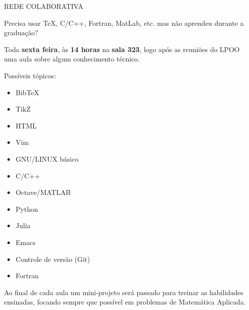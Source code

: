 \documentclass[12pt,a4paper]{letter}
\begin{document}
\pagestyle{empty}
\begin{Huge}
\begin{center}
	REDE COLABORATIVA
\end{center}
\end{Huge}

\begin{Large}

Precisa usar TeX, C/C++, Fortran, MatLab, etc. mas não aprendeu durante a graduação?


Toda {\bf sexta feira}, às {\bf 14 horas} na {\bf sala 323}, logo após as reuniões 
do LPOO uma aula sobre algum conhecimento t\'{e}cnico.

\begin{center}
\end{center}
 
Possíveis tópicos:

\begin{minipage}{.4\textwidth}
\begin{itemize}[leftmargin=*]
\item	BibTeX
\item	TikZ
\item	HTML
\item	Vim
\item	GNU/LINUX básico
\item	C/C++
\end{itemize}
\end{minipage}
\begin{minipage}{.4\textwidth}
\begin{itemize}[leftmargin=*]
\item	Octave/MATLAB
\item	Python
\item	Julia
\item	Emacs
\item	Controle de versão (Git)
\item 	Fortran
\end{itemize}
\end{minipage}
\vspace{1cm}

Ao final de cada aula um mini-projeto será passado para treinar as habilidades 
ensinadas, focando sempre que possível em problemas de Matemática Aplicada.


\end{Large}
\end{document}
